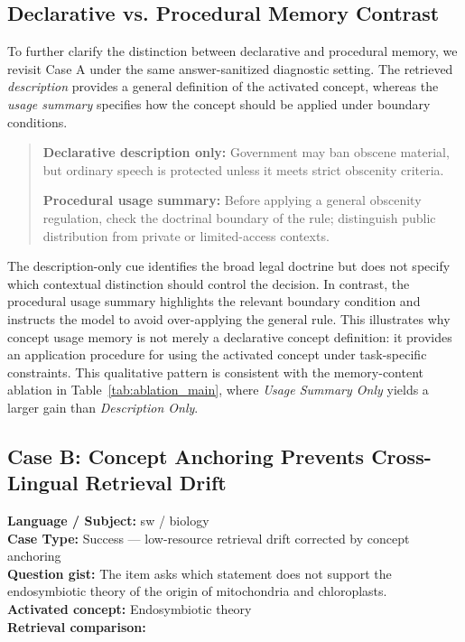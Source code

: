 \documentclass[11pt]{article}
\begin{document}
\subsection{Declarative vs. Procedural Memory Contrast}
\label{sec:app_declarative_procedural_contrast}

To further clarify the distinction between declarative and procedural memory, we revisit Case A under the same answer-sanitized diagnostic setting. The retrieved \textit{description} provides a general definition of the activated concept, whereas the \textit{usage summary} specifies how the concept should be applied under boundary conditions.

\begin{quote}\small
\textbf{Declarative description only:} Government may ban obscene material, but ordinary speech is protected unless it meets strict obscenity criteria.

\textbf{Procedural usage summary:} Before applying a general obscenity regulation, check the doctrinal boundary of the rule; distinguish public distribution from private or limited-access contexts.
\end{quote}

The description-only cue identifies the broad legal doctrine but does not specify which contextual distinction should control the decision. In contrast, the procedural usage summary highlights the relevant boundary condition and instructs the model to avoid over-applying the general rule. This illustrates why concept usage memory is not merely a declarative concept definition: it provides an application procedure for using the activated concept under task-specific constraints. This qualitative pattern is consistent with the memory-content ablation in Table~\ref{tab:ablation_main}, where \textit{Usage Summary Only} yields a larger gain than \textit{Description Only}.

\subsection{Case B: Concept Anchoring Prevents Cross-Lingual Retrieval Drift}
\noindent\textbf{Language / Subject:} sw / biology\\
\textbf{Case Type:} Success --- low-resource retrieval drift corrected by concept anchoring\\
\textbf{Question gist:} The item asks which statement does not support the endosymbiotic theory of the origin of mitochondria and chloroplasts.\\
\textbf{Activated concept:} Endosymbiotic theory\\
\textbf{Retrieval comparison:}
\end{document}
